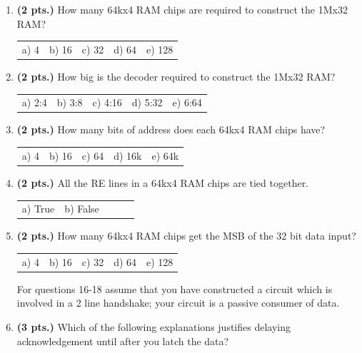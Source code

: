 \documentclass{article}
\begin{document}
\begin{enumerate}
\item {\bf (2 pts.)} How many 64kx4 RAM chips are required to construct 
the 1Mx32 RAM?

\begin{tabular}{p{0.75in}p{0.75in}p{0.75in}p{0.75in}p{0.75in}}
a) 4 & b) 16 & c) 32 & d) 64 & e) 128 \\
\end{tabular}

\item {\bf (2 pts.)} How big is the decoder required to construct the 
1Mx32 RAM?

\begin{tabular}{p{0.75in}p{0.75in}p{0.75in}p{0.75in}p{0.75in}}
a) 2:4 & b) 3:8 & c) 4:16 & d) 5:32 & e) 6:64 \\
\end{tabular}

\item {\bf (2 pts.)} How many bits of address does each 64kx4 RAM chips have?

\begin{tabular}{p{0.75in}p{0.75in}p{0.75in}p{0.75in}p{0.75in}}
a) 4 & b) 16 & c) 64 & d) 16k & e) 64k \\
\end{tabular}

\item {\bf (2 pts.)} All the RE lines in a 64kx4 RAM chips are tied together.

\begin{tabular}{p{0.75in}p{0.75in}p{0.75in}p{0.75in}p{0.75in}}
a) True & b) False  &      &      &      \\
\end{tabular}

\item {\bf (2 pts.)} How many 64kx4 RAM chips get the MSB of the 32 bit data input?

\begin{tabular}{p{0.75in}p{0.75in}p{0.75in}p{0.75in}p{0.75in}}
a) 4 & b) 16 & c) 32 & d) 64 & e) 128 \\
\end{tabular}

For questions 16-18 assume that you have constructed a circuit
which is involved in a 2 line handshake; your circuit
is a passive consumer of data.  

\item {\bf (3 pts.)} Which of the following explanations justifies delaying 
acknowledgement until after you latch the data?


\end{enumerate}
\end{document}
